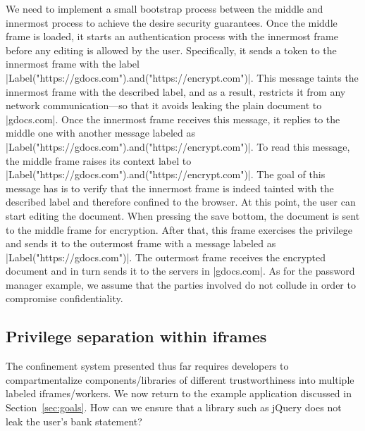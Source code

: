 We need to implement a small bootstrap process between the middle and innermost
process to achieve the desire security guarantees. Once the middle frame is
loaded, it starts an authentication process with the innermost frame before any
editing is allowed by the user. Specifically, it sends a token to the innermost
frame with the label \js|Label("https://gdocs.com").and("https://encrypt.com")|.
This message taints the innermost frame with the described label, and as a
result, restricts it from any network communication---so that it avoids leaking
the plain document to \js|gdocs.com|. Once the innermost frame receives this
message, it replies to the middle one with another message labeled as
\js|Label("https://gdocs.com").and("https://encrypt.com")|. To read this
message, the middle frame raises its context label to
\js|Label("https://gdocs.com").and("https://encrypt.com")|. The goal of this
message has is to verify that the innermost frame is indeed tainted with the
described label and therefore confined to the browser. At this point, the user
can start editing the document.  When pressing the save bottom, the document is
sent to the middle frame for encryption. After that, this frame exercises the
privilege  and sends it to the outermost frame with a message
labeled as \js|Label("https://gdocs.com")|. The outermost frame receives the
encrypted document and in turn sends it to the servers in \js|gdocs.com|. As for
the password manager example, we assume that the parties involved do not collude
in order to compromise confidentiality. 




\subsection{Privilege separation within iframes}
\label{sec:system:script}

The confinement system presented thus far requires developers to
compartmentalize components/libraries of different trustworthiness into
multiple labeled iframes/workers.
%
%
We now return to the  example application discussed in
Section~\ref{sec:goals}. How can we ensure that a library such as
jQuery does not leak the user's bank statement?

